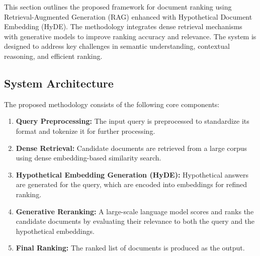 
This section outlines the proposed framework for document ranking using Retrieval-Augmented Generation (RAG) enhanced with Hypothetical Document Embedding (HyDE). The methodology integrates dense retrieval mechanisms with generative models to improve ranking accuracy and relevance. The system is designed to address key challenges in semantic understanding, contextual reasoning, and efficient ranking.

\subsection{System Architecture}
The proposed methodology consists of the following core components:
\begin{enumerate}
    \item \textbf{Query Preprocessing:} The input query is preprocessed to standardize its format and tokenize it for further processing.
    \item \textbf{Dense Retrieval:} Candidate documents are retrieved from a large corpus using dense embedding-based similarity search.
    \item \textbf{Hypothetical Embedding Generation (HyDE):} Hypothetical answers are generated for the query, which are encoded into embeddings for refined ranking.
    \item \textbf{Generative Reranking:} A large-scale language model scores and ranks the candidate documents by evaluating their relevance to both the query and the hypothetical embeddings.
    \item \textbf{Final Ranking:} The ranked list of documents is produced as the output.
\end{enumerate}

